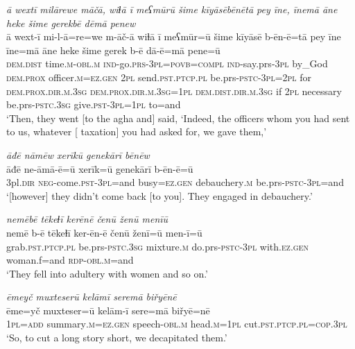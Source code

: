 \ea \label{BP.124}
\textit{ā wextī milārewe māčā, wiɫā ī meʕmūrū šime kīyāsēbēnētā pey īne, īnemā āne heke šime gerekbē dēmā penew} \\ 
\gll ā wext-ī mi-l-ā=re=we m-āč-ā wiɫā ī meʕmūr=ū šime kīyāsē b-ēn-ē=tā pey īne īne=mā āne heke šime gerek b-ē dā-ē=mā pene=ū \\ 
 \textsc{dem.dist} time\textsc{.m}\textsc{-obl}\textsc{.m} \textsc{ind-}go.\textsc{prs}\textsc{-3pl}\textsc{=\textsc{povb}}\textsc{=compl} \textsc{ind-}say.prs\textsc{-3pl} by\_God \textsc{dem.prox} officer\textsc{.m}\textsc{=ez.gen} \textsc{2pl} send\textsc{.pst}\textsc{.ptcp}\textsc{.pl} be.prs\textsc{-pstc}\textsc{-3pl}=\textsc{2pl} for \textsc{dem.prox}\textsc{.dir}\textsc{.m}\textsc{.3sg} \textsc{dem.prox}\textsc{.dir}\textsc{.m}\textsc{.3sg}\textsc{=\textsc{1pl}} \textsc{dem.dist}\textsc{.dir}\textsc{.m}\textsc{.3sg} if \textsc{2pl} necessary be.prs\textsc{-pstc}\textsc{.3sg} give\textsc{.pst}\textsc{-3pl}\textsc{=\textsc{1pl}} to=and \\ 
\glt `Then, they went [to the agha and] said, ‘Indeed, the officers whom you had sent to us, whatever [ taxation] you had asked for, we gave them,'
\z 
 
\ea \label{BP.125}
\textit{āđē nāmēw xerīkū genekārī bēnēw} \\ 
\gll āđē ne-āmā-ē=ū xerīk=ū genekārī b-ēn-ē=ū \\ 
 3pl\textsc{.dir} \textsc{neg-}come\textsc{.pst}\textsc{-3pl}=and busy\textsc{=ez.gen} debauchery\textsc{.m} be.prs\textsc{-pstc}\textsc{-3pl}=and \\ 
\glt `[however] they didn’t come back [to you]. They engaged in debauchery.'
\z 
 
\ea \label{BP.126}
\textit{nemēbē tēkeɫī kerēnē čenū ženū menīū} \\ 
\gll nemē b-ē tēkeɫī ker-ēn-ē čenū ženī=ū men-ī=ū \\ 
 grab\textsc{.pst}\textsc{.ptcp}\textsc{.pl} be.prs\textsc{-pstc}\textsc{.3sg} mixture\textsc{.m} do.prs\textsc{-pstc}\textsc{-3pl} with\textsc{.ez.gen} woman.f=and \textsc{rdp}\textsc{-obl}\textsc{.m}=and \\ 
\glt `They fell into adultery with women and so on.'
\z 
 
\ea \label{BP.127}
\textit{ēmeyč muxteserū kelāmī seremā biřyēnē} \\ 
\gll ēme=yč muxteser=ū kelām-ī sere=mā biřyē=nē \\ 
 \textsc{1pl}\textsc{=add} summary\textsc{.m}\textsc{=ez.gen} speech\textsc{-obl}\textsc{.m} head\textsc{.m}\textsc{=\textsc{1pl}} cut\textsc{.pst}\textsc{.ptcp}\textsc{.pl}\textsc{=cop}\textsc{.3pl} \\ 
\glt `So, to cut a long story short, we decapitated them.'
\z 
 
